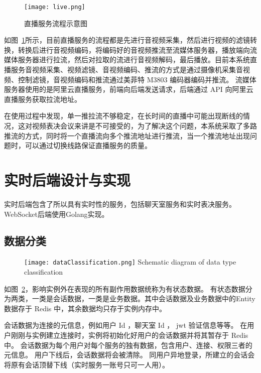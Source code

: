   \begin{figure}[!htp]
    \centering
    \texttt{[image: live.png]}
    \caption{直播服务流程示意图}
    \label{fig:live}
  \end{figure}

  如图~\ref{fig:live}所示，目前直播服务的流程都是先进行音视频采集，然后进行视频的滤镜转换，转换后进行音视频编码，将编码好的音视频推流至流媒体服务器，播放端向流媒体服务器进行拉流，然后对拉取的流进行音视频解码，最后播放。目前本系统直播服务音视频采集、视频滤镜、音视频编码、推流的方式是通过摄像机采集音视频、控制滤镜，音视频编码和推流通过美菲特 M3803 编码器编码并推流。
  流媒体服务器使用的是阿里云直播服务，前端向后端发送请求，后端通过 API 向阿里云直播服务获取拉流地址。

  在使用过程中发现，单一推拉流不够稳定，在长时间的直播中可能出现断线的情况，这对视频表决会议来讲是不可接受的，为了解决这个问题，本系统采取了多路推流的方式，同时将一个直播流向多个推流地址进行推流，当一个推流地址出现问题时，可以通过切换线路保证直播服务的质量。

  \section{实时后端设计与实现}
  实时后端包含了所以具有实时性的服务，包括聊天室服务和实时表决服务。WebSocket后端使用Golang实现。

  \subsection{数据分类}

\begin{figure}[!htp]
  \centering
  \texttt{[image: dataClassification.png]}
    {Schematic diagram of data type classification}
 \label{fig:dataClassification}
\end{figure}

如图~\ref{fig:dataClassification}，影响实例外在表现的所有副作用数据统称为有状态数据。
有状态数据分为两类，一类是会话数据，一类是业务数据。其中会话数据及业务数据中的Entity数据存于 Redis 中，其余数据均只存于实例内存中。

会话数据为连接的元信息，例如用户 Id ，聊天室 Id ， jwt 验证信息等等。
在用户刚刚与实例建立连接时，实例将初始化好用户的会话数据并将其暂存于 Redis 中。
会话数据为每个用户对每个服务的独有数据，包含用户、连接、权限三者的元信息。
用户下线后，会话数据将会被清除。
同用户异地登录，所建立的会话会将原有会话顶替下线（实时服务一账号只可一人用）。

